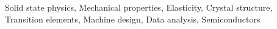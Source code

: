 \documentclass[]{article}
\begin{document}
Solid state physics, Mechanical properties, Elasticity, Crystal structure, Transition elements, Machine design, Data analysis, Semiconductors
\end{document}
